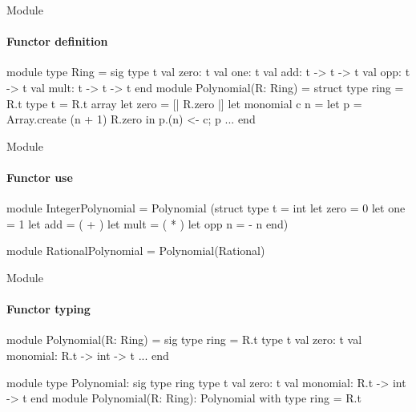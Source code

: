 \begin{frame}[fragile]{Module}
  \framesubtitle{Functor definition}
  
\begin{ocamlcode}
module type Ring = sig
  type t
  val zero: t         val one: t
  val add: t -> t -> t  val opp: t -> t
  val mult: t -> t -> t
end
module Polynomial(R: Ring) = struct
  type ring = R.t    type t = R.t array
  let zero = [| R.zero |]
  let monomial c n =
    let p = Array.create (n + 1) R.zero in
    p.(n) <- c; p
   ...
end
\end{ocamlcode}
\end{frame}

\begin{frame}[fragile]{Module}
  \framesubtitle{Functor use}

\begin{ocamlcode}
module IntegerPolynomial =
  Polynomial
    (struct
      type t = int
      let zero = 0
      let one = 1
      let add = ( + )
      let mult = ( * )
      let opp n = - n
    end)

module RationalPolynomial = 
  Polynomial(Rational)
\end{ocamlcode}
\end{frame}

\begin{frame}[fragile]{Module}
  \framesubtitle{Functor typing}

\begin{ocamlcode}
module Polynomial(R: Ring) = sig
  type ring = R.t    type t
  val zero: t      
  val monomial: R.t -> int -> t
  ...
end
  
module type Polynomial: sig
  type ring     type t
  val zero: t   val monomial: R.t -> int -> t
end
module Polynomial(R: Ring):
  Polynomial with type ring = R.t
\end{ocamlcode}

\end{frame}
